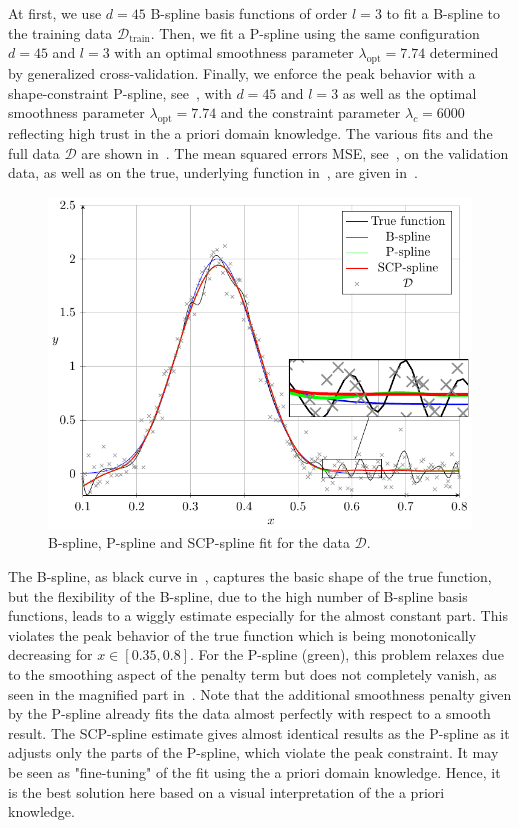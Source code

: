 At first, we use $d=45$ B-spline basis functions of order $l=3$ to fit a B-spline to the training data $\mathcal{D}_{\mathrm{train}}$. Then, we fit a P-spline using the same configuration $d=45$ and $l=3$ with an optimal smoothness parameter $\lambda_{\mathrm{opt}} = 7.74$ determined by generalized cross-validation. Finally, we enforce the peak behavior with a shape-constraint P-spline, see~, with $d=45$ and $l=3$ as well as the optimal smoothness parameter $\lambda_{\mathrm{opt}}=7.74$ and the constraint parameter $\lambda_c=6000$ reflecting high trust in the a priori domain knowledge. The various fits and the full data $\mathcal D$ are shown in~. The mean squared errors MSE, see~, on the validation data, as well as on the true, underlying function in~, are given in~.


\begin{figure}[H]
	\centering
	\includegraphics{graphics/pgfplots/cha4/exp-peak.pdf}
	\caption{B-spline, P-spline and SCP-spline fit for the data $\mathcal{D}$.}
	\label{fig:test-func-peak-fit}
\end{figure}
%
The B-spline, as black curve in~, captures the basic shape of the true function, but the flexibility of the B-spline, due to the high number of B-spline basis functions, leads to a wiggly estimate especially for the almost constant part. This violates the peak behavior of the true function which is being monotonically decreasing for $x \in [0.35, 0.8]$. For the P-spline (green), this problem relaxes due to the smoothing aspect of the penalty term but does not completely vanish, as seen in the magnified part in~. Note that the additional smoothness penalty given by the P-spline already fits the data almost perfectly with respect to a smooth result. The SCP-spline estimate gives almost identical results as the P-spline as it adjusts only the parts of the P-spline, which violate the peak constraint. It may be seen as "fine-tuning" of the fit using the a priori domain knowledge. Hence, it is the best solution here based on a visual interpretation of the a priori knowledge.

